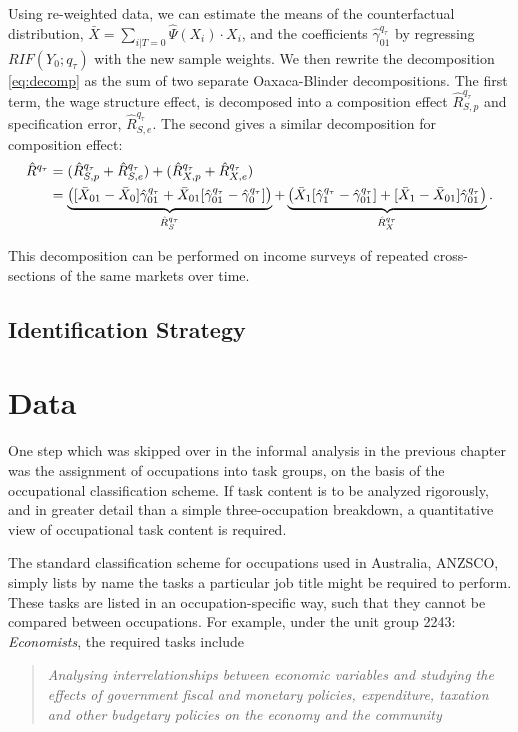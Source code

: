 Using re-weighted data, we can estimate the means of the counterfactual distribution, $\bar{X}=\sum_{i|T=0}\hat{\Psi}(X_i) \cdot X_i$, and the coefficients $\hat{\gamma}_{01}^{q_\tau}$ by regressing $RIF(Y_0;q_\tau)$ with the new sample weights. We then rewrite the decomposition \eqref{eq:decomp} as the sum of two separate Oaxaca-Blinder decompositions. The first term, the wage structure effect, is decomposed into a composition effect $\hat{R}^{q_\tau}_{S,p}$ and specification error, $\hat{R}^{q_\tau}_{S,e}$. The second gives a similar decomposition for composition effect:
\begin{align}
  \hat{R}^{q_\tau} &= (\hat{R}^{q_\tau}_{S,p} + \hat{R}^{q_\tau}_{S,e}) + (\hat{R}^{q_\tau}_{X,p} + \hat{R}^{q_\tau}_{X,e}) \notag \\
  &= \underbrace{\left( [\bar{X}_{01} - \bar{X}_0 ] \hat{\gamma}^{q_\tau}_{01} +
    \bar{X}_{01}[\hat{\gamma}_{01}^{q_\tau} - \hat{\gamma}_0^{q_\tau}] \right)}_{\hat{R}^{q_\tau}_{S}} +
  \underbrace{\left( \bar{X}_{1}[\hat{\gamma}_{1}^{q_\tau} - \hat{\gamma}_{01}^{q_\tau}] + 
    [\bar{X}_{1} - \bar{X}_{01} ] \hat{\gamma}^{q_\tau}_{01}\right)}_{\hat{R}^{q_\tau}_{X}}.
\end{align}

This decomposition can be performed on income surveys of repeated cross-sections of the same markets over time.

\subsection{Identification Strategy} \label{sec:id}

\section{Data}

One step which was skipped over in the informal analysis in the previous chapter was the assignment of occupations into task groups, on the basis of the occupational classification scheme. If task content is to be analyzed rigorously, and in greater detail than a simple three-occupation breakdown, a quantitative view of occupational task content is required. 

The standard classification scheme for occupations used in Australia, ANZSCO, simply lists by name the tasks a particular job title might be required to perform. These tasks are listed in an occupation-specific way, such that they cannot be compared between occupations. For example, under the unit group 2243: {\em Economists}, the required tasks include
\begin{quote}
{\em Analysing interrelationships between economic variables and studying the effects of government fiscal and monetary policies, expenditure, taxation and other budgetary policies on the economy and the community \citep[p.185]{Trewin2006}}
\end{quote}

